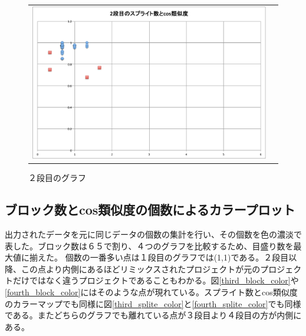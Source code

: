 \documentclass[a4paper,10pt,onecolumn,oneside,openany]{jsbook}
\begin{document}
\begin{figure}[h]
\begin{tabular}{cc}
\begin{minipage}[t]{0.45\hsize}
	 \includegraphics[keepaspectratio, scale = 0.25]{mazegame_second_splite.pdf}
	 \caption{２段目のグラフ}
	 \label{mazegame_second_splite_cos}
	\end{minipage}
 \end{tabular}
 \end{figure}
 
 \newpage
  \subsection{ブロック数とcos類似度の個数によるカラープロット}
出力されたデータを元に同じデータの個数の集計を行い、その個数を色の濃淡で表した。ブロック数は６５で割り、４つのグラフを比較するため、目盛り数を最大値に揃えた。 個数の一番多い点は１段目のグラフでは(1,1)である。２段目以降、この点より内側にあるほどリミックスされたプロジェクトが元のプロジェクトだけではなく違うプロジェクトであることもわかる。図\ref{third_block_color}や\ref{fourth_block_color}にはそのような点が現れている。スプライト数とcos類似度のカラーマップでも同様に図\ref{third_splite_color}と\ref{fourth_splite_color}でも同様である。またどちらのグラフでも離れている点が３段目より４段目の方が内側にある。
\end{document}
